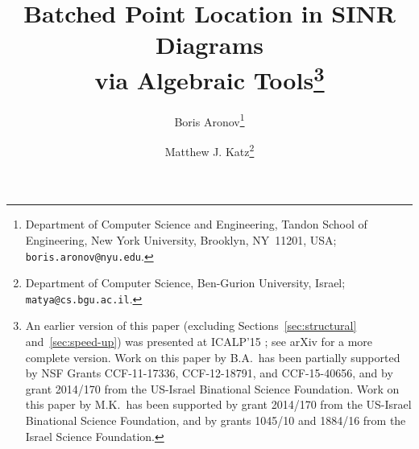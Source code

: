 \documentclass[11pt]{article}
\theoremstyle{remark}
\begin{document}
\title{Batched Point Location in SINR Diagrams\\via Algebraic Tools\thanks{An earlier version of this paper (excluding Sections~\ref{sec:structural} and~\ref{sec:speed-up}) was presented at ICALP'15
    \cite{ak-bpsdat-15}; see arXiv \cite{this-arXiv} for a more complete version.
    Work on this paper by B.A.\ has been partially supported by
		NSF Grants CCF-11-17336, CCF-12-18791, and CCF-15-40656, and by grant 2014/170 from the US-Israel Binational Science Foundation.
    Work on this paper by M.K.\ has been supported by grant 2014/170 from the US-Israel Binational Science Foundation, and by
    grants 1045/10 and 1884/16 from the Israel Science Foundation. }}




  \author{Boris Aronov\thanks{Department of Computer Science and Engineering, Tandon
      School of Engineering, New York University, Brooklyn, NY~11201,
      USA; \texttt{boris.aronov@nyu.edu}.}
\and
Matthew J. Katz\thanks{Department of Computer Science, Ben-Gurion University, Israel;
      \texttt{matya@cs.bgu.ac.il}.}  }
\maketitle
\end{document}
